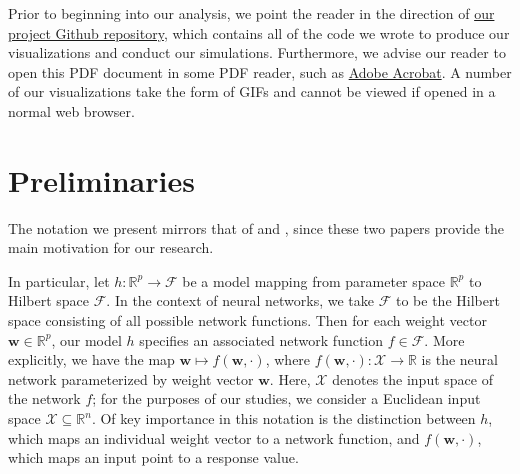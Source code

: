\documentclass{article}
\begin{document}
Prior to beginning into our analysis, we point the reader in the direction of \href{https://github.com/smithhenryd/NN-Kernel-and-Rich-Regimes}{our project Github repository}, which contains all of the code we wrote to produce our visualizations and conduct our simulations. Furthermore, we advise our reader to open this PDF document in some PDF reader, such as \href{https://www.adobe.com/acrobat/pdf-reader.html}{Adobe Acrobat}. A number of our visualizations take the form of GIFs and cannot be viewed if opened in a normal web browser.

\section{Preliminaries}\label{preliminaries}

The notation we present mirrors that of \cite{chizat2019lazy} and \cite{woodworth2020kernel}, since these two papers provide the main motivation for our research.

In particular, let $h: \mathbb{R}^p \rightarrow \mathcal{F}$ be a model mapping from parameter space $\mathbb{R}^p$ to Hilbert space $\mathcal{F}$. In the context of neural networks, we take $\mathcal{F}$ to be the Hilbert space consisting of all possible network functions. Then for each weight vector $\boldsymbol{w} \in \mathbb{R}^p$, our model $h$ specifies an associated network function $f \in \mathcal{F}$. More explicitly, we have the map $\boldsymbol{w} \mapsto f(\boldsymbol{w}, \cdot)$, where $f(\boldsymbol{w}, \cdot): \mathcal{X} \rightarrow \mathbb{R}$ is the neural network parameterized by weight vector $\boldsymbol{w}$. Here, $\mathcal{X}$ denotes the input space of the network $f$; for the purposes of our studies, we consider a Euclidean input space $\mathcal{X} \subseteq \mathbb{R}^n$. Of key importance in this notation is the distinction between $h$, which maps an individual weight vector to a network function, and $f(\boldsymbol{w}, \cdot)$, which maps an input point to a response value.
\end{document}
